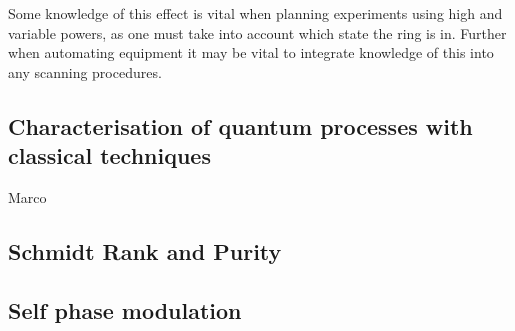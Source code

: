 Some knowledge of this effect is vital when planning experiments using high and variable powers, as one must take into account which state the ring is in. Further when automating equipment it may be vital to integrate knowledge of this into any scanning procedures. 

\subsection{Characterisation of quantum processes with classical techniques}
Marco \cite{helt_spontaneous_2010}

\subsection{Schmidt Rank and Purity}

\subsection{Self phase modulation}